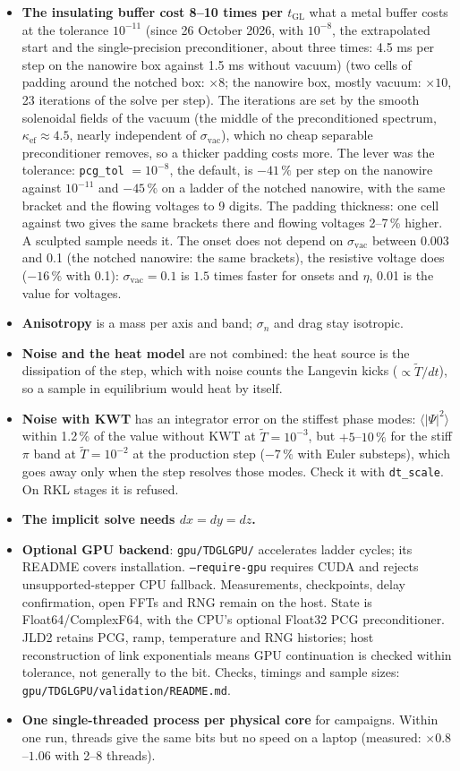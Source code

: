 \documentclass[11pt,a4paper]{article}
\newcommand{\tGL}{t_{\mathrm{GL}}}
\newcommand{\code}[1]{\texttt{#1}}
\begin{document}
\begin{itemize}
\item \textbf{The insulating buffer cost 8--10 times per $\tGL$} what a metal buffer costs at the tolerance $10^{-11}$ (since 26
  October 2026, with $10^{-8}$, the extrapolated start and the single-precision preconditioner, about three times: 4.5 ms per step on
  the nanowire box against 1.5 ms without vacuum) (two cells of padding around the
  notched box: $\times8$; the nanowire box, mostly vacuum: $\times10$, 23 iterations of the solve per step). The iterations are
  set by the smooth solenoidal fields of the vacuum (the middle of the preconditioned spectrum, $\kappa_{\mathrm{ef}}\approx4.5$,
  nearly independent of $\sigma_{\mathrm{vac}}$), which no cheap separable preconditioner removes, so a thicker padding costs more.
  The lever was the tolerance: \code{pcg\_tol} $= 10^{-8}$, the default, is $-41\,\%$ per step on the nanowire against $10^{-11}$
  and $-45\,\%$ on a ladder of the notched nanowire, with the same bracket and the flowing voltages to 9 digits. The padding
  thickness: one cell against two gives the same brackets there and flowing voltages 2--7\,\% higher. A sculpted sample needs it. The onset does not depend on
  $\sigma_{\mathrm{vac}}$ between 0.003 and 0.1 (the notched nanowire: the same brackets), the resistive voltage does ($-16\,\%$
  with 0.1): $\sigma_{\mathrm{vac}} = 0.1$ is $1.5$ times faster for onsets and $\eta$, 0.01 is the value for voltages.
\item \textbf{Anisotropy} is a mass per axis and band; $\sigma_n$ and drag stay isotropic.
\item \textbf{Noise and the heat model} are not combined: the heat source is the dissipation of the step, which with noise
  counts the Langevin kicks ($\propto\tilde T/dt$), so a sample in equilibrium would heat by itself.
\item \textbf{Noise with KWT} has an integrator error on the stiffest phase modes: $\langle|\Psi|^2\rangle$ within 1.2\,\% of the
  value without KWT at $\tilde T = 10^{-3}$, but $+5$--$10\,\%$ for the stiff $\pi$ band at $\tilde T = 10^{-2}$ at the production
  step ($-7\,\%$ with Euler substeps), which goes away only when the step resolves those modes. Check it with \code{dt\_scale}.
  On RKL stages it is refused.
\item \textbf{The implicit solve needs $dx = dy = dz$.}
\item \textbf{Optional GPU backend}: \code{gpu/TDGLGPU/} accelerates ladder cycles; its README covers installation.
\code{--require-gpu} requires CUDA and rejects unsupported-stepper CPU fallback. Measurements, checkpoints, delay
confirmation, open FFTs and RNG remain on the host. State is Float64/ComplexF64, with the CPU's optional Float32 PCG
preconditioner. JLD2 retains PCG, ramp, temperature and RNG histories; host reconstruction of link exponentials means GPU
continuation is checked within tolerance, not generally to the bit. Checks, timings and sample sizes:
\code{gpu/TDGLGPU/validation/README.md}.
\item \textbf{One single-threaded process per physical core} for campaigns. Within one run, threads give the same bits
  but no speed on a laptop (measured: $\times0.8$--$1.06$ with 2--8 threads).
\end{itemize}
\end{document}
